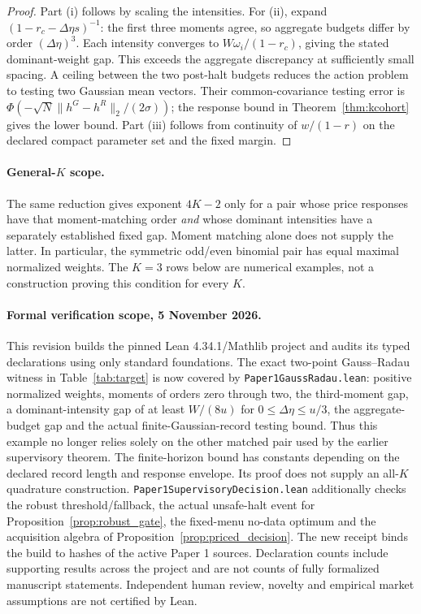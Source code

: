 \begin{proof}
Part (i) follows by scaling the intensities. For (ii), expand $(1-r_c-\Delta\eta s)^{-1}$: the first three moments agree, so aggregate budgets differ by order $(\Delta\eta)^3$. Each intensity converges to $W\omega_i/(1-r_c)$, giving the stated dominant-weight gap. This exceeds the aggregate discrepancy at sufficiently small spacing. A ceiling between the two post-halt budgets reduces the action problem to testing two Gaussian mean vectors. Their common-covariance testing error is $\Phi(-\sqrt N\|h^G-h^R\|_2/(2\sigma))$; the response bound in Theorem~\ref{thm:kcohort} gives the lower bound. Part (iii) follows from continuity of $w/(1-r)$ on the declared compact parameter set and the fixed margin.
\end{proof}

\paragraph{General-$K$ scope.} The same reduction gives exponent $4K-2$ only for a pair whose price responses have that moment-matching order \emph{and} whose dominant intensities have a separately established fixed gap. Moment matching alone does not supply the latter. In particular, the symmetric odd/even binomial pair has equal maximal normalized weights. The $K=3$ rows below are numerical examples, not a construction proving this condition for every $K$.

\paragraph{Formal verification scope, 5 November 2026.} This revision builds the pinned Lean 4.34.1/Mathlib project and audits its typed declarations using only standard foundations. The exact two-point Gauss--Radau witness in Table~\ref{tab:target} is now covered by \nolinkurl{Paper1GaussRadau.lean}: positive normalized weights, moments of orders zero through two, the third-moment gap, a dominant-intensity gap of at least $W/(8u)$ for $0\le\Delta\eta\le u/3$, the aggregate-budget gap and the actual finite-Gaussian-record testing bound. Thus this example no longer relies solely on the other matched pair used by the earlier supervisory theorem. The finite-horizon bound has constants depending on the declared record length and response envelope. Its proof does not supply an all-$K$ quadrature construction. \nolinkurl{Paper1SupervisoryDecision.lean} additionally checks the robust threshold/fallback, the actual unsafe-halt event for Proposition~\ref{prop:robust_gate}, the fixed-menu no-data optimum and the acquisition algebra of Proposition~\ref{prop:priced_decision}. The new receipt binds the build to hashes of the active Paper 1 sources. Declaration counts include supporting results across the project and are not counts of fully formalized manuscript statements. Independent human review, novelty and empirical market assumptions are not certified by Lean.

